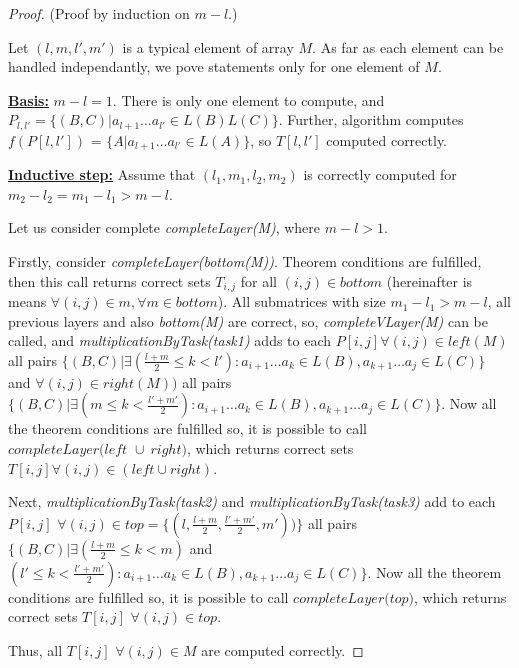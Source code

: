 \begin{proof}(Proof by induction on $m - l$.)

Let $(l, m, l', m')$ is a typical element of array $M$.
As far as each element can be handled independantly, we pove statements only for one element of $M$.

\underline{\textbf{Basis:}} $m - l = 1$. There is only one element to compute, and $P_{l, l'} =  \{ (B, C) |  a_{l + 1} \dots a_{l'} \in L(B)L(C)\}$. Further, algorithm computes $f(P[l, l'])$ = \linebreak $\{ A |  a_{l + 1} \dots a_{l'} \in L(A)\}$, so $T[l, l']$ computed correctly.

\underline{\textbf{Inductive step:}} Assume that $(l_1, m_1, l_2, m_2)$ is correctly computed for $m_2 - l_2 = m_1 - l_1 > m - l$.

Let us consider complete \textit{completeLayer(M)}, where $m - l > 1$.

Firstly, consider \textit{completeLayer(bottom(M))}.
Theorem conditions are fulfilled, then this call returns correct sets $T_{i, j}$ for all $(i, j) \in bottom$ (hereinafter is means $\forall (i, j) \in m, \forall m \in \textit{bottom} $).
All submatrices with size $ m_1 - l_1 > m - l $, all previous layers and also \textit{bottom(M)} are correct, so,  \textit{completeVLayer(M)} can be called, and \textit{multiplicationByTask(task1)} adds to each
$ P[i, j] \forall (i, j) \in left(M) $
all pairs
$ \{(B, C) |\exists (\frac{l+m}{2} \le k < l'): a_{i + 1} \dots a_{k} \in L(B), a_{k + 1} \dots a_{j} \in L(C)\} $
 and
$ \forall (i, j) \in right (M)) $
 all pairs
$ \{ (B, C) |\exists (m \le k < \frac{l'+m'}{2}): a_{i + 1} \dots a_{k} \in L(B), a_{k + 1} \dots a_{j} \in L(C)\}$.
Now all the theorem conditions are fulfilled so, it is possible to call $\textit{completeLayer(left } \cup  \ right)$, which returns correct sets $T[i, j] \forall (i, j) \in (left \cup right)$.

Next, \textit{multiplicationByTask(task2)} and \textit{multiplicationByTask(task3)} add to each $P[i, j]$ $\forall (i, j) \in top = \{(l, \frac{l+m}{2}, \frac{l'+m'}{2}, m'))\}$ all pairs $\{(B, C) |\exists (\frac{l+m}{2} \le k < m)$ and $(l' \le k < \frac{l'+m'}{2}) : a_{i + 1} \dots a_{k} \in L(B), a_{k + 1} \dots a_{j} \in L(C)\}$. Now all the theorem conditions are fulfilled so, it is possible to call $\textit{completeLayer(top)}$, which returns correct sets $T[i, j]$ $\forall (i, j) \in top$.

Thus, all $T[i, j]$ $\forall (i, j) \in M$ are computed correctly.
\end{proof}

